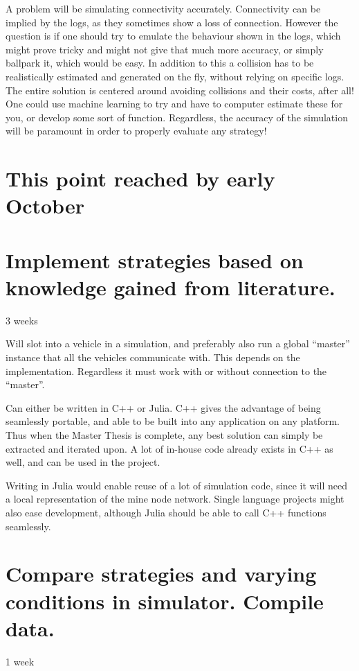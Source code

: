 \documentclass{article}
\begin{document}
    A problem will be simulating connectivity accurately. Connectivity can be implied by the logs, as they sometimes show a loss of connection. However the question is if one should try to emulate the behaviour shown in the logs, which might prove tricky and might not give that much more accuracy, or simply ballpark it, which would be easy. In addition to this a collision has to be realistically estimated and generated on the fly, without relying on specific logs. The entire solution is centered around avoiding collisions and their costs, after all! One could use machine learning to try and have to computer estimate these for you, or develop some sort of function. Regardless, the accuracy of the simulation will be paramount in order to properly evaluate any strategy!
    
    \section*{This point reached by early October}
    
    \section{ Implement strategies based on knowledge gained from literature.}
    3 weeks
    
    Will slot into a vehicle in a simulation, and preferably also run a global ``master'' instance that all the vehicles communicate with. This depends on the implementation. Regardless it must work with or without connection to the ``master''. 
    
    Can either be written in C++ or Julia. C++ gives the advantage of being seamlessly portable, and able to be built into any application on any platform. Thus when the Master Thesis is complete, any best solution can simply be extracted and iterated upon. A lot of in-house code already exists in C++ as well, and can be used in the project.
    
    Writing in Julia would enable reuse of a lot of simulation code, since it will need a local representation of the mine node network. Single language projects might also ease development, although Julia should be able to call C++ functions seamlessly.
    
    \section{Compare strategies and varying conditions in simulator. Compile data.} 
    1 week
    
\end{document}

